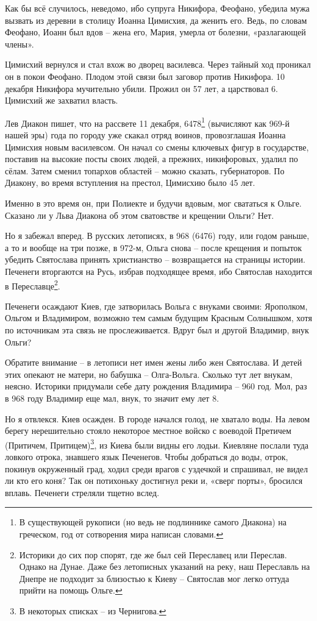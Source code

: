 Как бы всё случилось, неведомо, ибо супруга Никифора, Феофано, убедила мужа вызвать из деревни в столицу Иоанна Цимисхия, да женить его. Ведь, по словам Феофано, Иоанн был вдов – жена его, Мария, умерла от болезни, «разлагающей члены».

Цимисхий вернулся и стал вхож во дворец василевса. Через тайный ход проникал он в покои Феофано. Плодом этой связи был заговор против Никифора. 10 декабря Никифора мучительно убили. Прожил он 57 лет, а царствовал 6. Цимисхий же захватил власть.

Лев Диакон пишет, что на рассвете 11 декабря, 6478\footnote{В существующей рукописи (но ведь не подлиннике самого Диакона) на греческом, год от сотворения мира написан словами.} (вычисляют как 969-й нашей эры) года по городу уже скакал отряд воинов, провозглашая Иоанна Цимисхия новым василевсом. Он начал со смены ключевых фигур в государстве, поставив на высокие посты своих людей, а прежних, никифоровых, удалил по сёлам. Затем сменил топархов областей – можно сказать, губернаторов. По Диакону, во время вступления на престол, Цимисхию было 45 лет.

Именно в это время он, при Полиекте и будучи вдовым, мог свататься к Ольге. Сказано ли у Льва Диакона об этом сватовстве и крещении Ольги? Нет.

Но я забежал вперед. В русских летописях, в 968 (6476) году, или годом раньше, а то и вообще на три позже, в 972-м, Ольга снова – после крещения и попыток убедить Святослава принять христианство – возвращается на страницы истории. Печенеги вторгаются на Русь, избрав подходящее время, ибо Святослав находится в Переславце\footnote{Историки до сих пор спорят, где же был сей Переславец или Переслав. Однако на Дунае. Даже без летописных указаний на реку, наш Переславль на Днепре не подходит за близостью к Киеву – Святослав мог легко оттуда прийти на помощь Ольге.}.

Печенеги осаждают Киев, где затворилась Вольга с внуками своими: Ярополком, Ольгом и Владимиром, возможно тем самым будущим Красным Солнышком, хотя по источникам эта связь не прослеживается. Вдруг был и другой Владимир, внук Ольги?

Обратите внимание – в летописи нет имен жены либо жен Святослава. И детей этих опекают не матери, но бабушка – Олга-Вольга. Сколько тут лет внукам, неясно. Историки придумали себе дату рождения Владимира – 960 год. Мол, раз в 968 году Владимир еще мал, внук, то значит ему лет 8.

Но я отвлекся. Киев осажден. В городе начался голод, не хватало воды. На левом берегу нерешительно стояло некоторое местное войско с воеводой Претичем (Притичем, Притицем)\footnote{В некоторых списках – из Чернигова.}, из Киева были видны его лодьи. Киевляне послали туда ловкого отрока, знавшего язык Печенегов. Чтобы добраться до воды, отрок, покинув окруженный град, ходил среди врагов с уздечкой и спрашивал, не видел ли кто его коня? Так он потихоньку достигнул реки и, «сверг порты», бросился вплавь. Печенеги стреляли тщетно вслед.

